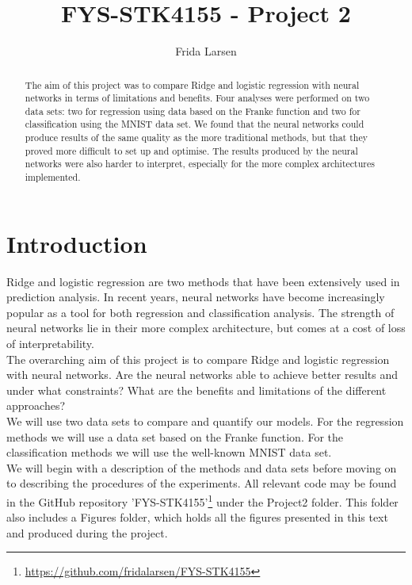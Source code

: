 \documentclass[notitlepage, reprint, nofootinbib]{revtex4-1}
\begin{document}
\title{FYS-STK4155 - Project 2}
\author{Frida Larsen}

\begin{abstract}
The aim of this project was to compare Ridge and logistic regression with neural networks in terms of limitations and benefits. Four analyses were performed on two data sets: two for regression using data based on the Franke function and two for classification using the MNIST data set. We found that the neural networks could produce results of the same quality as the more traditional methods, but that they proved more difficult to set up and optimise. The results produced by the neural networks were also harder to interpret, especially for the more complex architectures implemented.
\end{abstract}

\maketitle

\section{Introduction}
Ridge and logistic regression are two methods that have been extensively used in prediction analysis. In recent years, neural networks have become increasingly popular as a tool for both regression and classification analysis. The strength of neural networks lie in their more complex architecture, but comes at a cost of loss of interpretability.\\[2mm]
The overarching aim of this project is to compare Ridge and logistic regression with neural networks. Are the neural networks able to achieve better results and under what constraints? What are the benefits and limitations of the different approaches? \\[2mm]
We will use two data sets to compare and quantify our models. For the regression methods we will use a data set based on the Franke function. For the classification methods we will use the well-known MNIST data set. \\[2mm]
We will begin with a description of the methods and data sets before moving on to describing the procedures of the experiments. All relevant code may be found in the GitHub repository 'FYS-STK4155'\footnote{\href{GitHub Repository}{https://github.com/fridalarsen/FYS-STK4155}} under the Project2 folder. This folder also includes a Figures folder, which holds all the figures presented in this text and produced during the project.
\end{document}
